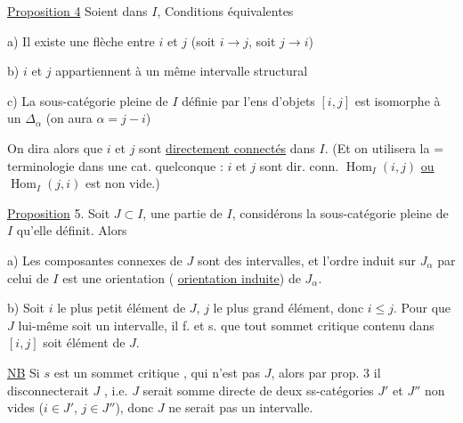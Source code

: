 
 \uline{Proposition 4} Soient   dans $I$,  Conditions équivalentes

a) Il existe une flèche entre $i$ et $j$ (soit $i\to j$, soit $j\to i$)

b) $i$ et $j$ appartiennent à un même intervalle structural 

c) La sous-catégorie pleine de $I$ définie par l'ens d'objets $[i,j]$ est isomorphe à un $\mathbb{\Delta}_{\alpha}$ (on aura $\alpha=j-i$)

On dira alors que $i$ et $j$ sont \uline{directement connectés} dans $I$. (Et on utilisera la $\mathord{=}$ terminologie dans une cat. quelconque : $i$ et $j$ sont dir. conn.  $\operatorname{Hom}_I(i,j)$ \uline{ou} $\operatorname{Hom}_I(j,i)$ est non vide.)

\uline{Proposition} 5. Soit $J\subset I$,  une partie de $I$, considérons la sous-catégorie pleine de $I$ qu'elle définit. Alors

a) Les composantes connexes  de $J$ sont des intervalles,  et l'ordre induit sur  $J_\alpha$ par celui de $I$ est une orientation ( \uline{orientation induite}) de $J_\alpha$.


b)  Soit $i$ le plus petit élément de $J$, $j$ le plus grand élément,  donc $i\leq j$. Pour que $J$ lui-même soit un intervalle, il f. et s. que tout sommet critique contenu dans $[i,j]$ soit élément de $J$.

\uline{NB} Si $s$ \inserted{$\in[i,j]$} est un sommet critique  ,   qui n'est pas  $J$, alors par prop. 3 il disconnecterait $J$ , i.e. $J$ serait somme directe de deux ss-catégories $J'$ et $J''$ non vides ($i\in J'$, $j\in J''$), donc $J$ ne serait pas un intervalle.

